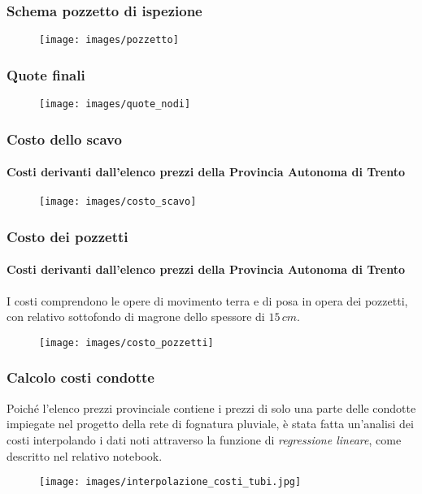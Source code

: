 \documentclass{beamer}
\newcommand{\nologo}{\setbeamertemplate{logo}{}}
\begin{document}
\begin{frame}
 \frametitle{Schema pozzetto di ispezione}
 \begin{figure}
  \centering
  \texttt{[image: images/pozzetto]}
 \end{figure}
\end{frame}

{\nologo
\begin{frame}
 \frametitle{Quote finali}
 \begin{figure}
  \centering
  \texttt{[image: images/quote\_nodi]}
 \end{figure}
\end{frame}
}
{\nologo
\begin{frame}
 \frametitle{Costo dello scavo}
 \framesubtitle{Costi derivanti dall'elenco prezzi della Provincia Autonoma di Trento}
 \begin{figure}
  \centering
  \texttt{[image: images/costo\_scavo]}
 \end{figure}
\end{frame}
}

\begin{frame}
 \frametitle{Costo dei pozzetti}
 \framesubtitle{Costi derivanti dall'elenco prezzi della Provincia Autonoma di Trento}
 I costi comprendono le opere di movimento terra e di posa in opera dei pozzetti, con relativo sottofondo di magrone dello spessore di $15\,cm$.
 \begin{figure}
  \centering
  \texttt{[image: images/costo\_pozzetti]}
 \end{figure}
\end{frame}

\begin{frame}
 \frametitle{Calcolo costi condotte}
 Poiché l'elenco prezzi provinciale contiene i prezzi di solo una parte delle condotte impiegate nel progetto della rete di fognatura pluviale, è stata fatta un'analisi dei costi interpolando i dati noti attraverso la funzione di \emph{regressione lineare}, come descritto nel relativo notebook.
 \begin{figure}
  \centering
  \texttt{[image: images/interpolazione\_costi\_tubi.jpg]}
 \end{figure}
\end{frame}
\end{document}
